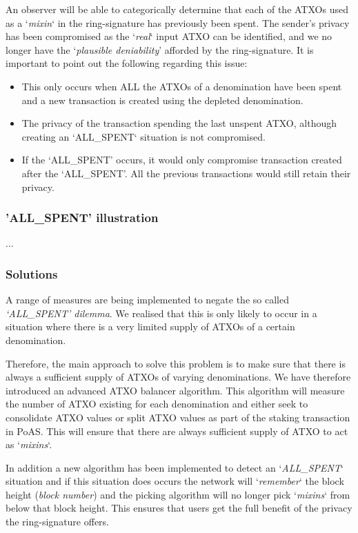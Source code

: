 An observer will be able to categorically determine that each of the ATXOs
used as a ‘\textit{mixin}‘ in the ring-signature has previously been spent.
The sender’s privacy has been compromised as the ‘\textit{real}‘ input ATXO
can be identified, and we no longer have the ‘\textit{plausible deniability}’
afforded by the ring-signature. It is important to point out the following
regarding this issue:



\begin{itemize}
	\item This only occurs when ALL the ATXOs of a denomination have been
	spent and a new transaction is created using the depleted denomination.
	\item The privacy of the transaction spending the last unspent ATXO,
	although creating an ‘ALL\_SPENT‘ situation is not compromised.
	\item If the ‘ALL\_SPENT’ occurs, it would only compromise transaction
	created after the ‘ALL\_SPENT’. All the previous transactions would still
	retain their privacy.
\end{itemize}



\subsubsection{'ALL\_SPENT' illustration}

...

\subsubsection{Solutions}
A range of measures are being implemented to negate the so called
\textit{‘ALL\_SPENT’ dilemma}. We realised that this is only likely
to occur in a situation where there is a very limited supply of
ATXOs of a certain denomination.

Therefore, the main approach to solve this problem is to make sure that
there is always a sufficient supply of ATXOs of varying denominations.
We have therefore introduced an advanced ATXO balancer algorithm. This
algorithm will measure the number of ATXO existing for each denomination
and either seek to consolidate ATXO values or split ATXO values as part
of the staking transaction in PoAS. This will ensure that there are
always sufficient supply of ATXO to act as ‘\textit{mixins}‘.



In addition a new algorithm has been implemented to detect an
‘\textit{ALL\_SPENT}‘ situation and if this situation does occurs
the network will ‘\textit{remember}‘ the block height (\textit{block number})
and the picking algorithm will no longer pick ‘\textit{mixins}‘
from below that block height. This ensures that users get the full
benefit of the privacy the ring-signature offers.



